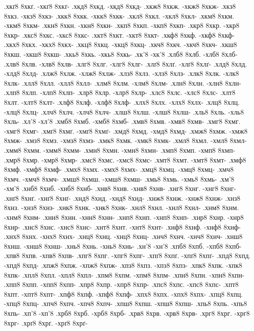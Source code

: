 {.хкґ8 8хкґ. -хкґ8 8хкґ-
.хкд8 8хкд. -хкд8 8хкд-
.хкж8 8хкж. -хкж8 8хкж-
.хкз8 8хкз. -хкз8 8хкз-
.хкк8 8хкк. -хкк8 8хкк-
.хкл8 8хкл. -хкл8 8хкл-
.хкм8 8хкм. -хкм8 8хкм-
.хкн8 8хкн. -хкн8 8хкн-
.хкп8 8хкп. -хкп8 8хкп-
.хкр8 8хкр. -хкр8 8хкр-
.хкс8 8хкс. -хкс8 8хкс-
.хкт8 8хкт. -хкт8 8хкт-
.хкф8 8хкф. -хкф8 8хкф-
.хкх8 8хкх. -хкх8 8хкх-
.хкц8 8хкц. -хкц8 8хкц-
.хкч8 8хкч. -хкч8 8хкч-
.хкш8 8хкш. -хкш8 8хкш-
.хкь8 8хкь. -хкь8 8хкь-
.хк'8 -хк'8
.хлб8 8хлб. -хлб8 8хлб-
.хлв8 8хлв. -хлв8 8хлв-
.хлг8 8хлг. -хлг8 8хлг-
.хлґ8 8хлґ. -хлґ8 8хлґ-
.хлд8 8хлд. -хлд8 8хлд-
.хлж8 8хлж. -хлж8 8хлж-
.хлз8 8хлз. -хлз8 8хлз-
.хлк8 8хлк. -хлк8 8хлк-
.хлл8 8хлл. -хлл8 8хлл-
.хлм8 8хлм. -хлм8 8хлм-
.хлн8 8хлн. -хлн8 8хлн-
.хлп8 8хлп. -хлп8 8хлп-
.хлр8 8хлр. -хлр8 8хлр-
.хлс8 8хлс. -хлс8 8хлс-
.хлт8 8хлт. -хлт8 8хлт-
.хлф8 8хлф. -хлф8 8хлф-
.хлх8 8хлх. -хлх8 8хлх-
.хлц8 8хлц. -хлц8 8хлц-
.хлч8 8хлч. -хлч8 8хлч-
.хлш8 8хлш. -хлш8 8хлш-
.хль8 8хль. -хль8 8хль-
.хл'8 -хл'8
.хмб8 8хмб. -хмб8 8хмб-
.хмв8 8хмв. -хмв8 8хмв-
.хмг8 8хмг. -хмг8 8хмг-
.хмґ8 8хмґ. -хмґ8 8хмґ-
.хмд8 8хмд. -хмд8 8хмд-
.хмж8 8хмж. -хмж8 8хмж-
.хмз8 8хмз. -хмз8 8хмз-
.хмк8 8хмк. -хмк8 8хмк-
.хмл8 8хмл. -хмл8 8хмл-
.хмм8 8хмм. -хмм8 8хмм-
.хмн8 8хмн. -хмн8 8хмн-
.хмп8 8хмп. -хмп8 8хмп-
.хмр8 8хмр. -хмр8 8хмр-
.хмс8 8хмс. -хмс8 8хмс-
.хмт8 8хмт. -хмт8 8хмт-
.хмф8 8хмф. -хмф8 8хмф-
.хмх8 8хмх. -хмх8 8хмх-
.хмц8 8хмц. -хмц8 8хмц-
.хмч8 8хмч. -хмч8 8хмч-
.хмш8 8хмш. -хмш8 8хмш-
.хмь8 8хмь. -хмь8 8хмь-
.хм'8 -хм'8
.хнб8 8хнб. -хнб8 8хнб-
.хнв8 8хнв. -хнв8 8хнв-
.хнг8 8хнг. -хнг8 8хнг-
.хнґ8 8хнґ. -хнґ8 8хнґ-
.хнд8 8хнд. -хнд8 8хнд-
.хнж8 8хнж. -хнж8 8хнж-
.хнз8 8хнз. -хнз8 8хнз-
.хнк8 8хнк. -хнк8 8хнк-
.хнл8 8хнл. -хнл8 8хнл-
.хнм8 8хнм. -хнм8 8хнм-
.хнн8 8хнн. -хнн8 8хнн-
.хнп8 8хнп. -хнп8 8хнп-
.хнр8 8хнр. -хнр8 8хнр-
.хнс8 8хнс. -хнс8 8хнс-
.хнт8 8хнт. -хнт8 8хнт-
.хнф8 8хнф. -хнф8 8хнф-
.хнх8 8хнх. -хнх8 8хнх-
.хнц8 8хнц. -хнц8 8хнц-
.хнч8 8хнч. -хнч8 8хнч-
.хнш8 8хнш. -хнш8 8хнш-
.хнь8 8хнь. -хнь8 8хнь-
.хн'8 -хн'8
.хпб8 8хпб. -хпб8 8хпб-
.хпв8 8хпв. -хпв8 8хпв-
.хпг8 8хпг. -хпг8 8хпг-
.хпґ8 8хпґ. -хпґ8 8хпґ-
.хпд8 8хпд. -хпд8 8хпд-
.хпж8 8хпж. -хпж8 8хпж-
.хпз8 8хпз. -хпз8 8хпз-
.хпк8 8хпк. -хпк8 8хпк-
.хпл8 8хпл. -хпл8 8хпл-
.хпм8 8хпм. -хпм8 8хпм-
.хпн8 8хпн. -хпн8 8хпн-
.хпп8 8хпп. -хпп8 8хпп-
.хпр8 8хпр. -хпр8 8хпр-
.хпс8 8хпс. -хпс8 8хпс-
.хпт8 8хпт. -хпт8 8хпт-
.хпф8 8хпф. -хпф8 8хпф-
.хпх8 8хпх. -хпх8 8хпх-
.хпц8 8хпц. -хпц8 8хпц-
.хпч8 8хпч. -хпч8 8хпч-
.хпш8 8хпш. -хпш8 8хпш-
.хпь8 8хпь. -хпь8 8хпь-
.хп'8 -хп'8
.хрб8 8хрб. -хрб8 8хрб-
.хрв8 8хрв. -хрв8 8хрв-
.хрг8 8хрг. -хрг8 8хрг-
.хрґ8 8хрґ. -хрґ8 8хрґ-
}
